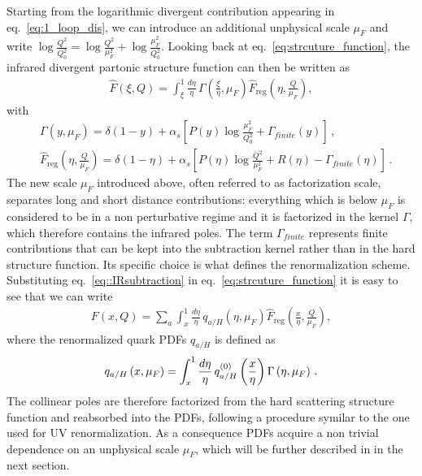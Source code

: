 %
Starting from the logarithmic divergent contribution appearing in eq.~\eqref{eq:1_loop_dis}, we can introduce an
additional unphysical scale $\mu_F$ and write
$\log\frac{Q^2}{Q_0^2} = \log\frac{Q^2}{\mu_F^2} + \log\frac{\mu_F^2}{Q_0^2} $.
Looking back at eq.~\eqref{eq:strcuture_function},
the infrared divergent partonic structure function can then be written as
\begin{align}
  \label{eq::IRsubtraction}
  \hat{F}\left(\xi,Q\right) = 
  \int_{\xi}^1 \frac{d\eta}{\eta} \,\Gamma\left(\frac{\xi}{\eta},\mu_F\right)
  \hat{F}_{\text{reg}}\left(\eta,\frac{Q}{\mu_F}\right) ,
\end{align}
with
\begin{align}
    &\Gamma\left(y,\mu_F\right) = \delta\left(1-y\right) 
    + \alpha_s\left[P\left(y\right)\log\frac{\mu_F^2}{Q_0^2} + \Gamma_{finite}\left(y\right)\right]\,, \\
    &\hat{F}_{\text{reg}}\left(\eta,\frac{Q}{\mu_F}\right) = \delta\left(1-\eta\right)  
    + \alpha_s
    \left[P\left(\eta\right)\log\frac{Q^2}{\mu_F^2}+ R\left(\eta\right) - \Gamma_{finite}\left(\eta\right) \right]\,.  
\end{align}
The new scale $\mu_F$ introduced above, often referred to as factorization scale, separates long and short distance 
contributions: everything which is below $\mu_F$ is considered to be in a non perturbative regime 
and it is factorized in the kernel $\Gamma$, which therefore contains the infrared poles.
The term $\Gamma_{finite}$ represents finite contributions that can be
kept into the subtraction kernel rather than in the hard structure function. Its specific choice is what defines
the renormalization scheme.  
Substituting eq.~\eqref{eq::IRsubtraction} in eq.~\eqref{eq:strcuture_function} it is easy to see that
we can write
\begin{align}
  F\left(x,Q\right) = \sum_a\int_x^1 \frac{d\eta}{\eta}\, 
  q_{a/H}\left(\eta,\mu_F\right)\hat{F}_{\text{reg}}\left(\frac{x}{\eta},\frac{Q}{\mu_F}\right),
\end{align}
where the renormalized quark PDFs $q_{a/H}$ is defined as
\begin{align}
    \label{eq:renormalized_pdf}
    q_{a/H}\left(x,\mu_F\right) = \int_x^1 \frac{d\eta}{\eta} \,
    q^{{(0)}}_{a/H}\left(\frac{x}{\eta}\right)\Gamma\left(\eta, \mu_F\right)\,.
\end{align}
The collinear poles are therefore factorized from the hard scattering structure function and reabsorbed into
the PDFs, following a procedure symilar to the one used for UV renormalization.
As a consequence PDFs acquire a non trivial dependence on an unphysical scale $\mu_F$,
which will be further described in in the next section.

